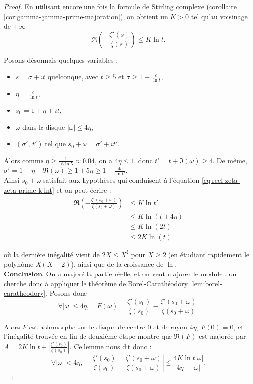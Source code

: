 \documentclass[french]{report}
\begin{document}
\begin{proof}
  En utilisant encore une fois la formule de Stirling complexe (corollaire \ref{cor:gamma-gamma-prime-majoration}), on obtient un $K>0$ tel qu'au voisinage de $+\infty$
  \begin{equation}\label{eq:reel-zeta-zeta-prime-k-lnt}
    \Re\left(-\frac{\zeta'(s)}{\zeta(s)}\right) \leq K\ln t.
  \end{equation}

  Posons désormais quelques variables :
  \begin{itemize}
    \item $s=\sigma+it$ quelconque, avec $t\geq 5$ et $\sigma\geq1-\frac{c}{\ln t}$,
    \item $\eta=\frac{c}{\ln t}$,
    \item $s_0 = 1 + \eta + it$,
    \item $\omega$ dans le disque $|\omega|\leq 4\eta$,
    \item $(\sigma',\,t')$ tel que $s_0+\omega=\sigma'+it'$.
  \end{itemize}
  
  Alors comme $\eta\geq\frac{1}{16\ln 5}\approx 0.04$, on a $4\eta\leq 1$, donc $t'=t+\Im(\omega)\geq 4$. De même, $\sigma'=1+\eta+\Re(\omega)\geq 1+5\eta\geq1-\frac{4c}{\ln t'}$.
  \\
  Ainsi $s_0+\omega$ satisfait aux hypothèses qui conduisent à l'équation \ref{eq:reel-zeta-zeta-prime-k-lnt} et on peut écrire :
  \begin{align*}
    \Re\left(-\frac{\zeta'(s_0+\omega)}{\zeta(s_0+\omega)}\right)
    &\leq K\ln t' \\
    &\leq K\ln (t+4\eta) \\
    &\leq K\ln (2t) \\
    &\leq 2K\ln (t)
  \end{align*}

  où la dernière inégalité vient de $2X\leq X^2$ pour $X\geq 2$ (en étudiant rapidement le polynôme $X(X-2)$), ainsi que de la croissance de $\ln$.
  \\

  \textbf{Conclusion}. On a majoré la partie réelle, et on veut majorer le module : on cherche donc à appliquer le théorème de Borel-Carathéodory \ref{lem:borel-caratheodory}. Posons donc
  \[
    \forall|\omega|\leq 4\eta,\quad
    F(\omega)=\frac{\zeta'(s_0)}{\zeta(s_0)}-\frac{\zeta'(s_0+\omega)}{\zeta(s_0+\omega)}.
  \]

  Alors $F$ est holomorphe sur le disque de centre 0 et de rayon $4\eta$, $F(0)=0$, et l'inégalité trouvée en fin de deuxième étape montre que $\Re(F)$ est majorée par $A=2K\ln t+\left|\frac{\zeta'(s_0)}{\zeta(s_0)}\right|$. Ce lemme nous dit donc :
  \[
    \forall |\omega|<4\eta,\quad
    \left|\frac{\zeta'(s_0)}{\zeta(s_0)}-\frac{\zeta'(s_0+\omega)}{\zeta(s_0+\omega)}\right|
    \leq\frac{4K\ln t|\omega|}{4\eta-|\omega|}.
  \]


\end{proof}
\end{document}
